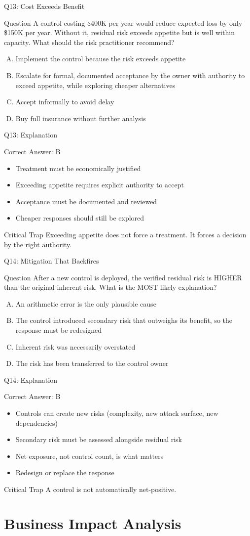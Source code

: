 \documentclass[aspectratio=169]{beamer}
\newcommand{\hq}[7]{%
	\begin{frame}{Q#1: #2}
		\begin{block}{Question}
			#3
		\end{block}
		\begin{enumerate}[(A)]
			#4
		\end{enumerate}
	\end{frame}
	\begin{frame}{Q#1: Explanation}
		\begin{block}{Correct Answer: #5}
			\begin{itemize}
				#6
			\end{itemize}
		\end{block}
		\begin{alertblock}{Critical Trap}
			#7
		\end{alertblock}
	\end{frame}
}
\begin{document}
	\hq{13}{Cost Exceeds Benefit}
	{A control costing \$400K per year would reduce expected loss by only \$150K per year. Without it, residual risk exceeds appetite but is well within capacity. What should the risk practitioner recommend?}
	{\item Implement the control because the risk exceeds appetite
		\item Escalate for formal, documented acceptance by the owner with authority to exceed appetite, while exploring cheaper alternatives
		\item Accept informally to avoid delay
		\item Buy full insurance without further analysis}
	{B}
	{\item Treatment must be economically justified
		\item Exceeding appetite requires explicit authority to accept
		\item Acceptance must be documented and reviewed
		\item Cheaper responses should still be explored}
	{Exceeding appetite does not force a treatment. It forces a decision by the right authority.}
	
	\hq{14}{Mitigation That Backfires}
	{After a new control is deployed, the verified residual risk is HIGHER than the original inherent risk. What is the MOST likely explanation?}
	{\item An arithmetic error is the only plausible cause
		\item The control introduced secondary risk that outweighs its benefit, so the response must be redesigned
		\item Inherent risk was necessarily overstated
		\item The risk has been transferred to the control owner}
	{B}
	{\item Controls can create new risks (complexity, new attack surface, new dependencies)
		\item Secondary risk must be assessed alongside residual risk
		\item Net exposure, not control count, is what matters
		\item Redesign or replace the response}
	{A control is not automatically net-positive.}
	
	\section{Business Impact Analysis}
	
\end{document}
